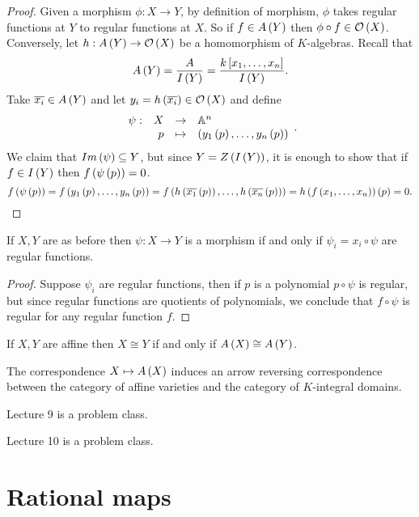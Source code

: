 \begin{proof}
Given a morphism $ \phi : X \to Y $, by definition of morphism, $ \phi $ takes regular functions at $ Y $ to regular functions at $ X $. So if $ f \in A\left( Y \right) $ then $ \phi \circ f \in \mathcal{O}\left( X \right) $. Conversely, let $ h : A\left( Y \right) \to \mathcal{O}\left( X \right) $ be a homomorphism of $ K $-algebras. Recall that
$$ A\left( Y \right) = \dfrac{A}{I\left( Y \right)} = \dfrac{k\left[ x_1, \dots, x_n \right]}{I\left( Y \right)}. $$
Take $ \overline{x_i} \in A\left( Y \right) $ and let $ y_i = h\left( \overline{x_i} \right) \in \mathcal{O}\left( X \right) $ and define
$$ \function[\psi]{X}{\A^n}{p}{\rb{y_1\rb{p}, \dots, y_n\rb{p}}}. $$
We claim that $ Im\left( \psi \right) \subseteq Y $, but since $ Y = Z\left( I\left( Y \right) \right) $, it is enough to show that if $ f \in I\left( Y \right) $ then $ f\left( \psi\left( p \right) \right) = 0 $.
$$ f\left( \psi\left( p \right) \right) = f\left( y_1\left( p \right), \dots, y_n\left( p \right) \right) = f\left( h\left( \overline{x_1}\left( p \right) \right), \dots, h\left( \overline{x_n}\left( p \right) \right) \right) = h\left( f\left( x_1, \dots, x_n \right) \right)\left( p \right) = 0. $$
\end{proof}

\begin{lemma}
If $ X, Y $ are as before then $ \psi : X \to Y $ is a morphism if and only if $ \psi_i = x_i \circ \psi $ are regular functions.
\end{lemma}

\begin{proof}
Suppose $ \psi_i $ are regular functions, then if $ p $ is a polynomial $ p \circ \psi $ is regular, but since regular functions are quotients of polynomials, we conclude that $ f \circ \psi $ is regular for any regular function $ f $.
\end{proof}

\begin{corollary}
If $ X, Y $ are affine then $ X \cong Y $ if and only if $ A\left( X \right) \cong A\left( Y \right) $.
\end{corollary}

\begin{corollary}
The correspondence $ X \mapsto A\left( X \right) $ induces an arrow reversing correspondence between the category of affine varieties and the category of $ K $-integral domains.
\end{corollary}


Lecture 9 is a problem class.


Lecture 10 is a problem class.

\pagebreak

\section{Rational maps}

